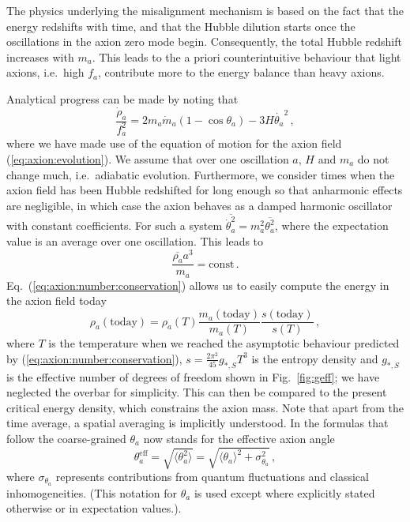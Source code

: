 \documentclass[preprint,nofootinbib]{revtex4}
\newcommand{\eq}[1]{Eq.~(#1)}
\begin{document}
The physics underlying the misalignment mechanism is based on the fact that the energy redshifts with time, and that the Hubble dilution starts once the oscillations in the axion zero mode begin.  Consequently, the total Hubble redshift increases with $m_a$. This leads to the a priori counterintuitive behaviour that light axions, i.e.\ high $f_a$, contribute more to the energy balance than heavy axions.

Analytical progress can be made by noting that
\begin{equation}
\frac{\dot{\rho}_a}{f_a^2} = 2m_a\dot{m}_a(1-\cos\theta_a)-3H\dot{\theta_a}^2 \,,
\end{equation}
where we have made use of the equation of motion for the axion field (\ref{eq:axion:evolution}). We assume that over one oscillation $a$, $H$ and $m_a$ do not change much, i.e.\ adiabatic evolution. Furthermore, we consider times when the axion field has been Hubble redshifted for long enough so that anharmonic effects are negligible, in which case the axion behaves as a damped harmonic oscillator with constant coefficients. For such a system $\overline{\dot{\theta}^2_a}=m^2_a \overline{\theta^2_a}$, where the expectation value is an average over one oscillation. This leads to
\begin{equation}
\frac{\overline{\rho_a}a^3}{m_a} = \mathrm{const} \,. \label{eq:axion:number:conservation}
\end{equation}
\eq{\ref{eq:axion:number:conservation}} allows us to easily compute the energy in the axion field today
\begin{equation}
\rho_a(\mathrm{today}) = \rho_a(T)\frac{m_a(\mathrm{today})}{m_a(T)}\frac{s(\mathrm{today})}{s(T)}\, ,\label{eq:axion:energy:density:today}
\end{equation}
where $T$ is the temperature when we reached the asymptotic behaviour predicted by (\ref{eq:axion:number:conservation}), $s=\frac{2\pi^2}{45}g_{*,S}T^3$ is the entropy density and $g_{*,S}$ is the effective number of degrees of freedom shown in Fig.~\ref{fig:geff}; we have neglected the overbar for simplicity. This can then be compared to the present critical energy density, which constrains the axion mass. Note that apart from the time average, a spatial averaging is implicitly understood. In the formulas that follow the coarse-grained $\theta_a$ now stands for the effective axion angle 
\begin{equation}
\theta_a^\mathrm{eff}=\sqrt{\langle \theta_a^2 \rangle} = \sqrt{\langle \theta_a \rangle^2 + \sigma_{\theta_a}^2}\,,
\end{equation}
where $\sigma_{\theta_a}$ represents contributions from quantum fluctuations and classical inhomogeneities. (This notation for $\theta_a$ is used except where explicitly stated otherwise or in expectation values.).
\end{document}
